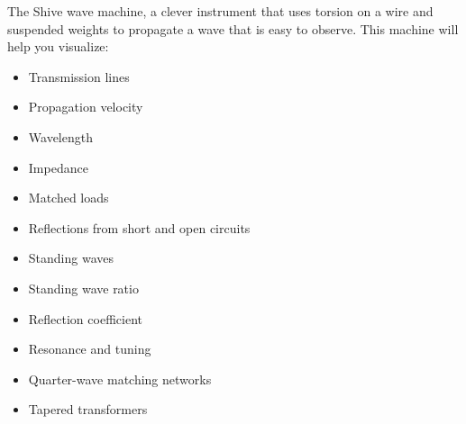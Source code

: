 \documentclass{article}
\begin{document}
The Shive wave machine, a clever instrument that uses torsion on a wire and suspended weights to propagate a wave that is easy to observe. This machine will help you visualize:
\begin{itemize}
	\item Transmission lines
	\item Propagation velocity
	\item Wavelength
	\item Impedance
	\item Matched loads
	\item Reflections from short and open circuits
	\item Standing waves
	\item Standing wave ratio
	\item Reflection coefficient
	\item Resonance and tuning
	\item Quarter-wave matching networks
	\item Tapered transformers
\end{itemize}
\end{document}
